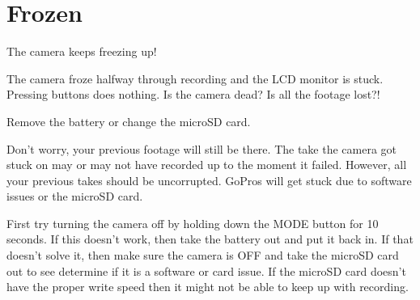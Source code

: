 \chapter{Frozen}
\pagecolor{white}
\label{chap:18}
\begin{fullwidth}


\problem

{\large The camera keeps freezing up! \par}

The camera froze halfway through recording and the LCD monitor is stuck. Pressing buttons does nothing. Is the camera dead? Is all the footage lost?! 


\solution

{\large Remove the battery or change the microSD card. \par}

Don’t worry, your previous footage will still be there. The take the camera got stuck on may or may not have recorded up to the moment it failed. However, all your previous takes should be uncorrupted. GoPros will get stuck due to software issues or the microSD card. 

First try turning the camera off by holding down the MODE button for 10 seconds. 
If this doesn’t work, then take the battery out and put it back in. If that doesn't solve it, then make sure the camera is OFF and take the microSD card out to see determine if it is a software or card issue. If the microSD card doesn't have the proper write speed then it might not be able to keep up with recording. 






\clearpage
\end{fullwidth}
